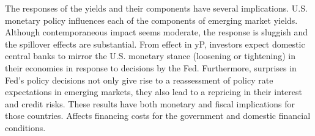 {The responses of the yields and their components have several implications.
U.S. monetary policy influences each of the components of emerging market yields.
Although contemporaneous impact seems moderate, the response is sluggish and the spillover effects are substantial.
From effect in yP, investors expect domestic central banks to mirror the U.S. monetary stance (loosening or tightening) in their economies in response to decisions by the Fed.
Furthermore, surprises in Fed's policy decisions not only give rise to a reassessment of policy rate expectations in emerging markets, they also lead to a repricing in their interest and credit risks.
These results have both monetary and fiscal implications for those countries.
Affects financing costs for the government and domestic financial conditions.






%	
%	
%	
%	

}{}	%



